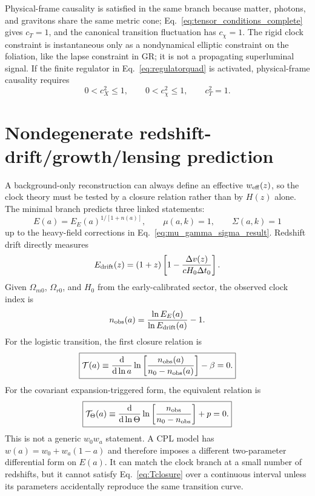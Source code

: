 \documentclass[aps,prd,reprint,nofootinbib,superscriptaddress,longbibliography]{revtex4-2}
\newcommand{\dd}{\mathrm{d}}
\begin{document}
Physical-frame causality is satisfied in the same branch because matter, photons, and gravitons share the same metric cone; Eq.~\eqref{eq:tensor_conditions_complete} gives $c_T=1$, and the canonical transition fluctuation has $c_\chi=1$.  The rigid clock constraint is instantaneous only as a nondynamical elliptic constraint on the foliation, like the lapse constraint in GR; it is not a propagating superluminal signal.  If the finite regulator in Eq.~\eqref{eq:regulatorquad} is activated, physical-frame causality requires
\begin{equation}
  0<c_X^2\le1,
  \qquad
  0<c_\chi^2\le1,
  \qquad
  c_T^2=1.
  \label{eq:causality_conditions}
\end{equation}

\section{Nondegenerate redshift-drift/growth/lensing prediction}
\label{sec:nondegenerate_prediction_completion}

A background-only reconstruction can always define an effective $w_{\rm eff}(z)$, so the clock theory must be tested by a closure relation rather than by $H(z)$ alone.  The minimal branch predicts three linked statements:
\begin{equation}
  E(a)=E_E(a)^{1/[1+n(a)]},
  \qquad
  \mu(a,k)=1,
  \qquad
  \Sigma(a,k)=1
  \label{eq:three_predictions}
\end{equation}
up to the heavy-field corrections in Eq.~\eqref{eq:mu_gamma_sigma_result}.  Redshift drift directly measures
\begin{equation}
  E_{\rm drift}(z)=(1+z)\left[1-\frac{\Delta v(z)}{cH_0\Delta t_0}\right].
  \label{eq:E_from_drift}
\end{equation}
Given $\Omega_{m0}$, $\Omega_{r0}$, and $H_0$ from the early-calibrated sector, the observed clock index is
\begin{equation}
  n_{\rm obs}(a)=\frac{\ln E_E(a)}{\ln E_{\rm drift}(a)}-1 .
  \label{eq:nobs_from_drift}
\end{equation}
For the logistic transition, the first closure relation is
\begin{equation}
  \boxed{
  {\cal T}(a)\equiv
  \frac{\dd}{\dd\ln a}\ln\left[\frac{n_{\rm obs}(a)}{n_0-n_{\rm obs}(a)}\right]-\beta=0 .}
  \label{eq:Tclosure}
\end{equation}
For the covariant expansion-triggered form, the equivalent relation is
\begin{equation}
  \boxed{
  {\cal T}_\Theta(a)\equiv
  \frac{\dd}{\dd\ln\Theta}\ln\left[\frac{n_{\rm obs}}{n_0-n_{\rm obs}}\right]+p=0 .}
  \label{eq:Ttheta_closure}
\end{equation}
This is not a generic $w_0w_a$ statement.  A CPL model has $w(a)=w_0+w_a(1-a)$ and therefore imposes a different two-parameter differential form on $E(a)$.  It can match the clock branch at a small number of redshifts, but it cannot satisfy Eq.~\eqref{eq:Tclosure} over a continuous interval unless its parameters accidentally reproduce the same transition curve.
\end{document}
